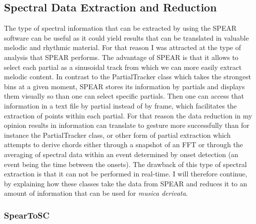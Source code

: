 \subsection{Spectral Data Extraction and Reduction}

The type of spectral information that can be extracted by using the SPEAR software can be useful as it could yield results that can be translated in valuable melodic and rhythmic material. For that reason I was attracted at the type of analysis that SPEAR performs. The advantage of SPEAR is that it allows to select each partial as a sinusoidal track from which we can more easily extract melodic content. In contrast to the PartialTracker class which takes the strongest bins at a given moment, SPEAR stores its information by partials and displays them visually so than one can select specific partials. Then one can access that information in a text file by partial instead of by frame, which facilitates the extraction of points within each partial. For that reason the data reduction in my opinion results in information can translate to gesture more successfully than for instance the PartialTracker class, or other form of partial extraction which attempts to derive chords either through a snapshot of an FFT or through the averaging of spectral data within an event determined by onset detection (an event being the time between the onsets). The drawback of this type of spectral extraction is that it can not be performed in real-time. I will therefore continue, by explaining how these classes take the data from SPEAR and reduces it to an amount of information that can be used for \emph{musica derivata}.

\subsubsection{SpearToSC}
\hypertarget{spearsc}{}


